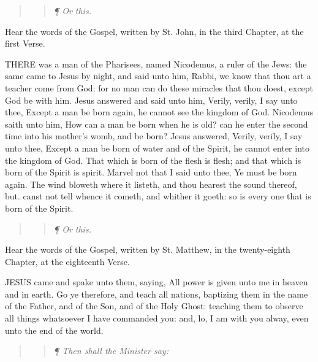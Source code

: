 \begin{quote}

\begin{quote}

\emph{¶
Or this.}

\end{quote}

\end{quote}

Hear the words of the Gospel, written by St. John, in the third Chapter,
at the first Verse.

THERE
was a man of the Pharisees, named Nicodemus, a ruler of the Jews: the
same came to Jesus by night, and said unto him, Rabbi, we know that thou
art a teacher come from God: for no man can do these miracles that thou
doest, except God be with him. Jesus answered and said unto him, Verily,
verily, I say unto thee, Except a man be born again, he cannot see the
kingdom of God. Nicodemus saith unto him, How can a man be born when he
is old? can he enter the second time into his mother’s womb, and
be born? Jesus answered, Verily, verily, I say unto thee, Except a man
be born of water and of the Spirit, he cannot enter into the kingdom of
God. That which is born of the flesh is flesh; and that which is born
of the Spirit is spirit. Marvel not that I said unto thee, Ye must be
born again. The wind bloweth where it listeth, and thou hearest the sound
thereof, but. canst not tell whence it cometh, and whither it goeth: so
is every one that is born of the Spirit.

\begin{quote}

\begin{quote}

\emph{¶ Or this.}

\end{quote}

\end{quote}

Hear the words of the Gospel, written by St. Matthew, in the twenty-eighth
Chapter, at the eighteenth Verse.

JESUS
came and spake unto them, saying, All power is given unto me in heaven
and in earth. Go ye therefore, and teach all nations, baptizing them in
the name of the Father, and of the Son, and of the Holy Ghost: teaching
them to observe all things whatsoever I have commanded you: and, lo, I
am with you alway, even unto the end of the world.

\begin{quote}

\begin{quote}

\emph{¶
Then shall the Minister say:}

\end{quote}

\end{quote}

